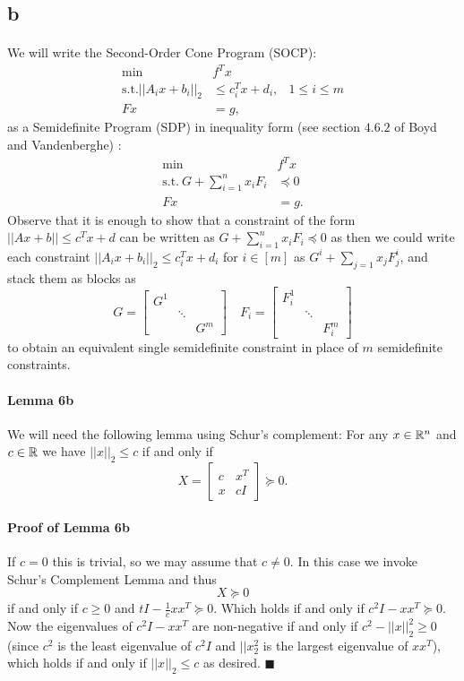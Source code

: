 \documentclass[letterpaper,12pt,oneside,onecolumn]{article}
\begin{document}
\subsection{b}
\paragraph{}
We will write the Second-Order Cone Program (SOCP):
\begin{align*}
\min &f^Tx \\
\text{s.t.} ||A_ix + b_i||_2 &\leq c^T_i x + d_i, &1\leq i \leq m \\
Fx &= g,
\end{align*}
as a Semidefinite Program (SDP) in inequality form (see section $4.6.2$ of Boyd and Vandenberghe) :
\begin{align*}
\min\ &f^Tx \\
\text{s.t.}\ G + \sum_{i=1}^n x_i F_i &\preccurlyeq 0 \\
Fx &=g.
\end{align*}
Observe that it is enough to show that a constraint of the form $||Ax + b|| \leq c^Tx + d$ can be written as $G + \sum_{i=1}^n x_i F_i \preccurlyeq 0$ as then we could write each constraint $||A_ix + b_i||_2 \leq c^T_i x + d_i$ for $i\in [m]$ as $G^i + \sum_{j=1} x_j F^i_j$, and stack them as blocks as
$$G = \begin{bmatrix} G^1 & & \\ & \ddots & \\ & & G^m \end{bmatrix} \quad F_i = \begin{bmatrix} F^1_i & & \\ & \ddots & \\ & & F^m_i \end{bmatrix}$$
to obtain an equivalent single semidefinite constraint in place of $m$ semidefinite constraints.
\paragraph{Lemma 6b}
We will need the following lemma using Schur's complement: For any $x\in \mathbb{R}^n$ and $c\in \mathbb{R}$ we have $||x||_2 \leq c$ if and only if
$$X = \begin{bmatrix} c &x^T \\ x & cI\end{bmatrix} \succcurlyeq 0.$$
\paragraph{Proof of Lemma 6b}
If $c = 0$ this is trivial, so we may assume that $c\neq 0$. In this case we invoke Schur's Complement Lemma and thus
$$X \succcurlyeq 0$$
if and only if $c \geq 0$ and $tI - \frac{1}{c}xx^T \succcurlyeq 0$. Which holds if and only if $c^2I - xx^T \succcurlyeq 0$. Now the eigenvalues of $c^2I - xx^T$ are non-negative if and only if $c^2 - ||x||^2_2 \geq 0$ (since $c^2$ is the least eigenvalue of $c^2I$ and $||x^2_2$ is the largest eigenvalue of $xx^T$), which holds if and only if $||x||_2 \leq c$ as desired. $\blacksquare$
\end{document}
